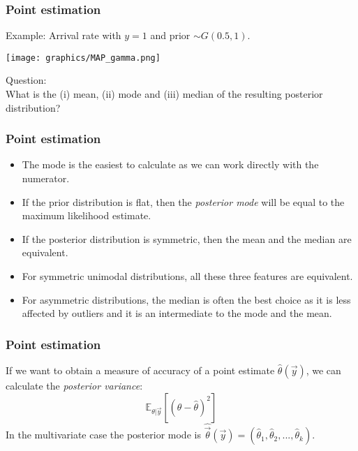 \documentclass{beamer}
\newcommand{\E}{\mathbb{E}}
\newcommand{\1}{\ensuremath{\mathbf{1}}}
\begin{document}
%
%
%
\begin{frame}\frametitle{Point estimation}
	Example: Arrival rate with $y = 1$ and prior $\sim G (0.5, 1)$.
	\begin{center}
		\texttt{[image: graphics/MAP\_gamma.png]}
	\end{center}
	Question:\\
	What is the (i) mean, (ii) mode and (iii) median of the resulting posterior distribution?
\end{frame}
%
%
%
\begin{frame}\frametitle{Point estimation}
	\begin{itemize}
		\item The mode is the easiest to calculate as we can work directly with the numerator.
		\item If the prior distribution is flat, then the \emph{posterior mode} will be equal to the maximum likelihood estimate.
		\item If the posterior distribution is symmetric, then the mean and the median are equivalent.
		\item For symmetric unimodal distributions, all these three features are equivalent.
		\item For asymmetric distributions, the median is often the best choice as it is less affected by outliers and it is an intermediate to the mode and the mean.
	\end{itemize}
\end{frame}
%
%
%
\begin{frame}\frametitle{Point estimation}
	If we want to obtain a measure of accuracy of a point estimate $\hat\theta(\vec{y})$, we can calculate the \emph{posterior variance}:
	\begin{equation}
		\E_{\theta|\vec{y}}[(\theta-\hat\theta)^2]
	\end{equation}
	In the multivariate case the posterior mode is $\hat{\vec{\theta}}(\vec{y}) = (\hat\theta_1,\hat\theta_2,...,\hat\theta_k)$.
\end{frame}
\end{document}
